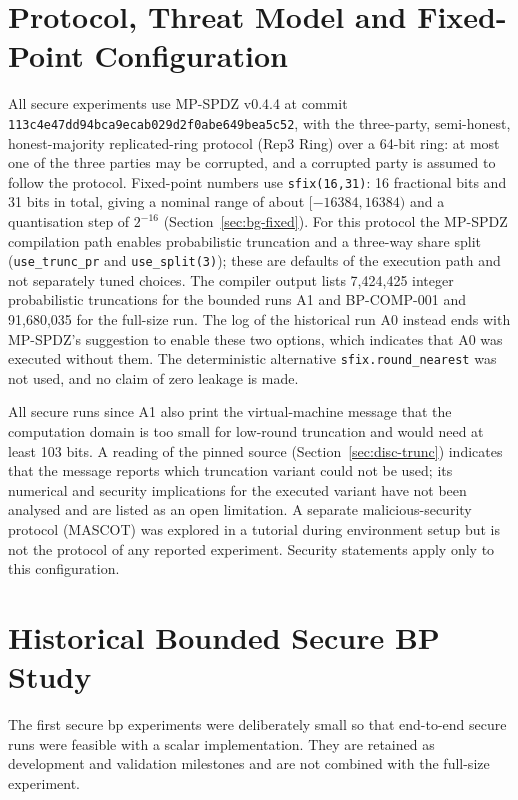 \section{Protocol, Threat Model and Fixed-Point Configuration}\label{sec:method-protocol}
All secure experiments use MP-SPDZ v0.4.4 \cite{keller2020mpspdz} at commit \texttt{113c4e47\allowbreak dd94bca9\allowbreak ecab029d\allowbreak 2f0abe64\allowbreak 9bea5c52}, with the three-party, semi-honest, honest-majority replicated-ring protocol (Rep3 Ring) over a 64-bit ring: at most one of the three parties may be corrupted, and a corrupted party is assumed to follow the protocol. Fixed-point numbers use \texttt{sfix(16,31)}: 16 fractional bits and 31 bits in total, giving a nominal range of about $[-16384,16384)$ and a quantisation step of $2^{-16}$ (Section~\ref{sec:bg-fixed}). For this protocol the MP-SPDZ compilation path enables probabilistic truncation and a three-way share split (\texttt{use\_trunc\_pr} and \texttt{use\_split(3)}); these are defaults of the execution path and not separately tuned choices. The compiler output lists 7{,}424{,}425 integer probabilistic truncations for the bounded runs A1 and BP-COMP-001 and 91{,}680{,}035 for the full-size run. The log of the historical run A0 instead ends with MP-SPDZ's suggestion to enable these two options, which indicates that A0 was executed without them. The deterministic alternative \texttt{sfix.round\_nearest} was not used, and no claim of zero leakage is made.

All secure runs since A1 also print the virtual-machine message that the computation domain is too small for low-round truncation and would need at least 103 bits. A reading of the pinned source (Section~\ref{sec:disc-trunc}) indicates that the message reports which truncation variant could not be used; its numerical and security implications for the executed variant have not been analysed and are listed as an open limitation. A separate malicious-security protocol (MASCOT) was explored in a tutorial during environment setup but is not the protocol of any reported experiment. Security statements apply only to this configuration.

\section{Historical Bounded Secure BP Study}\label{sec:method-scenario}
The first secure \ac{bp} experiments were deliberately small so that end-to-end secure runs were feasible with a scalar implementation. They are retained as development and validation milestones and are not combined with the full-size experiment.

